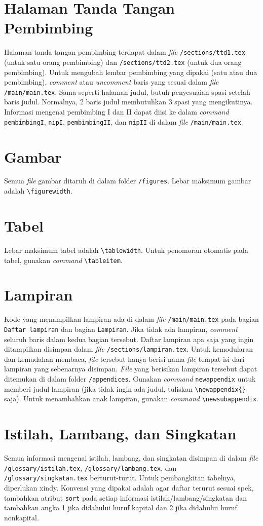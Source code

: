 \documentclass[11pt,a4paper]{article}
\begin{document}
\section{Halaman Tanda Tangan Pembimbing}
Halaman tanda tangan pembimbing terdapat dalam \textit{file} \verb|/sections/ttd1.tex| (untuk satu orang pembimbing) dan \verb|/sections/ttd2.tex| (untuk dua orang pembimbing). Untuk mengubah lembar pembimbing yang dipakai (satu atau dua pembimbing), \textit{comment} atau \textit{uncomment} baris yang sesuai dalam \textit{file} \verb|/main/main.tex|. Sama seperti halaman judul, butuh penyesuaian spasi setelah baris judul. Normalnya, 2 baris judul membutuhkan 3 spasi yang mengikutinya. Informasi mengenai pembimbing I dan II dapat diisi ke dalam \textit{command} \verb|pembimbingI|, \verb|nipI|, \verb|pembimbingII|, dan \verb|nipII| di dalam \textit{file} \verb|/main/main.tex|.

\section{Gambar}
Semua \textit{file} gambar ditaruh di dalam folder \verb|/figures|. Lebar maksimum gambar adalah \verb|\figurewidth|.

\section{Tabel}
Lebar maksimum tabel adalah \verb|\tablewidth|. Untuk penomoran otomatis pada tabel, gunakan \textit{command} \verb|\tableitem|.

\section{Lampiran}
Kode yang menampilkan lampiran ada di dalam \textit{file} \verb|/main/main.tex| pada bagian \verb|Daftar lampiran| dan bagian \verb|Lampiran|. Jika tidak ada lampiran, \textit{comment} seluruh baris dalam kedua bagian tersebut. Daftar lampiran apa saja yang ingin ditampilkan disimpan dalam \textit{file} \verb|/sections/lampiran.tex|. Untuk kemodularan dan kemudahan membaca, \textit{file} tersebut hanya berisi nama \textit{file} tempat isi dari lampiran yang sebenarnya disimpan. \textit{File} yang berisikan lampiran tersebut dapat ditemukan di dalam folder \verb|/appendices|. Gunakan \textit{command} \verb|newappendix| untuk memberi judul lampiran (jika tidak ingin ada judul, tuliskan \verb|\newappendix{}| saja). Untuk menambahkan anak lampiran, gunakan \textit{command} \verb|\newsubappendix|.

\section{Istilah, Lambang, dan Singkatan}
Semua informasi mengenai istilah, lambang, dan singkatan disimpan di dalam \textit{file} \verb|/glossary/istilah.tex|, \verb|/glossary/lambang.tex|, dan \verb|/glossary/singkatan.tex| berturut-turut. Untuk pembangkitan tabelnya, diperlukan xindy. Konvensi yang dipakai adalah agar daftar terurut sesuai spek, tambahkan atribut \verb|sort| pada setiap informasi istilah/lambang/singkatan dan tambahkan angka 1 jika didahului huruf kapital dan 2 jika didahului huruf nonkapital.
\end{document}
